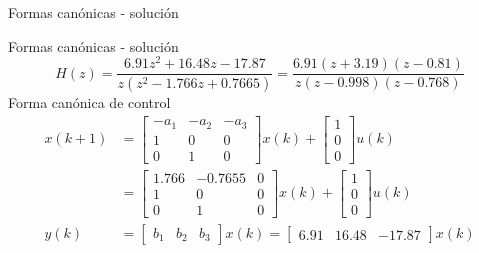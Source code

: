 \documentclass[presentation,aspectratio=1610]{beamer}
\begin{document}
\begin{frame}[label={sec:org8e71ee4}]{Formas canónicas - solución}
\end{frame}
\begin{frame}[label={sec:orgec43f7d}]{Formas canónicas - solución}
\[ H(z) = \frac{6.91z^2 + 16.48z -17.87}{z(z^2 - 1.766z + 0.7665)} = \frac{6.91(z+3.19)(z-0.81)}{z(z-0.998)(z-0.768)}\]
Forma canónica de control
\begin{align*}
 x(k+1) &= \begin{bmatrix} -a_1 & -a_2 & -a_3\\1 & 0 & 0\\0 & 1 & 0\end{bmatrix} x(k) + \begin{bmatrix}1\\0\\0\end{bmatrix} u(k) \\
   &= \begin{bmatrix} 1.766 & -0.7655 & 0\\1 & 0 & 0\\0 &1 & 0\end{bmatrix} x(k) +  \begin{bmatrix}1\\0\\0\end{bmatrix} u(k) \\
 y(k) &= \begin{bmatrix} b_1 & b_2 & b_3 \end{bmatrix} x(k)
 = \begin{bmatrix} 6.91 & 16.48 & -17.87 \end{bmatrix} x(k)
 \end{align*}
\end{frame}
\end{document}
